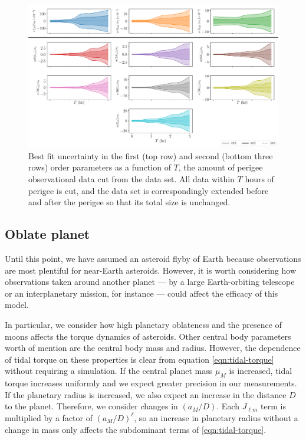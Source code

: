 \documentclass{aastex631}
\begin{document}
\begin{figure}
  \centering
  \includegraphics[width=\textwidth]{observation-gap.pdf}
  \caption{Best fit uncertainty in the first (top row) and second (bottom three rows) order parameters as a function of $T$, the amount of perigee observational data cut from the data set. All data within $T$ hours of perigee is cut, and the data set is correspondingly extended before and after the perigee so that its total size is unchanged.}
  \label{fig:observation-gap}
\end{figure}


\subsection{Oblate planet}


Until this point, we have assumed an asteroid flyby of Earth because observations are most plentiful for near-Earth asteroids. However, it is worth considering how observations taken around another planet --- by a large Earth-orbiting telescope or an interplanetary mission, for instance --- could affect the efficacy of this model.

In particular, we consider how high planetary oblateness and the presence of moons affects the torque dynamics of asteroids. Other central body parameters worth of mention are the central body mass and radius. However, the dependence of tidal torque on these properties is clear from equation \ref{eqn:tidal-torque} without requiring a simulation. If the central planet mass $\mu_M$ is increased, tidal torque increases uniformly and we expect greater precision in our measurements. If the planetary radius is increased, we also expect an increase in the distance $D$ to the planet. Therefore, we consider changes in $(a_M/D)$. Each $J_{\ell m}$ term is multiplied by a factor of $(a_M/D)^\ell$, so an increase in planetary radius without a change in mass only affects the subdominant terms of \ref{eqn:tidal-torque}.
\end{document}

